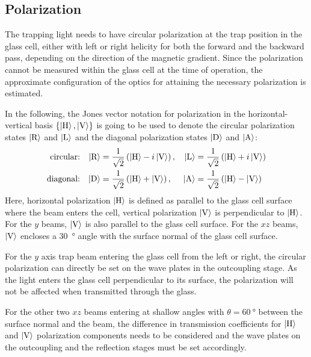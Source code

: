 \subsection*{Polarization}
The trapping light needs to have circular polarization at the trap position in the glass cell, either with left or right helicity for both the forward and the backward pass, depending on the direction of the magnetic gradient. Since the polarization cannot be measured within the glass cell at the time of operation, the approximate configuration of the optics for attaining the necessary polarization is estimated.

In the following, the Jones vector notation for polarization in the horizontal-vertical basis $\{\Ket{\text{H}}, \Ket{\text{V}}\}$ is going to be used to denote the circular polarization states $\Ket{\text{R}}$ and $\Ket{\text{L}}$ and the diagonal polarization states $\Ket{\text{D}}$ and $\Ket{\text{A}}$:
\begin{align}
        \text{circular:} && \Ket{\text{R}} &= \frac{1}{\sqrt{2}} \left(\Ket{\text{H}} - i \Ket{\text{V}}\right),  & \Ket{\text{L}} &= \frac{1}{\sqrt{2}} \left(\Ket{\text{H}} + i \Ket{\text{V}}\right) \\
        \text{diagonal:} && \Ket{\text{D}} &= \frac{1}{\sqrt{2}} \left(\Ket{\text{H}} + \Ket{\text{V}}\right),  &  \Ket{\text{A}} &= \frac{1}{\sqrt{2}} \left(\Ket{\text{H}} - \Ket{\text{V}}\right)
\end{align}
Here, horizontal polarization $\Ket{\text{H}}$ is defined as parallel to the glass cell surface  where the beam enters the cell, vertical polarization $\Ket{\text{V}}$ is perpendicular to $\Ket{\text{H}}$. For the $y$ beams, $\Ket{\text{V}}$ is also parallel to the glass cell surface. For the $xz$ beams, $\Ket{\text{V}}$ encloses a \SI{30}{\degree} angle with the surface normal of the glass cell surface.

For the $y$ axis trap beam entering the glass cell from the left or right, the circular polarization can directly be set on the wave plates in the outcoupling stage. As the light enters the glass cell perpendicular to its surface, the polarization will not be affected when transmitted through the glass.

For the other two $xz$ beams entering at shallow angles with $\theta = \SI{60}{\degree}$ between the surface normal and the beam, the difference in transmission coefficients for $\Ket{\text{H}}$ and $\Ket{\text{V}}$ polarization components needs to be considered and the wave plates on the outcoupling and the reflection stages must be set accordingly.

